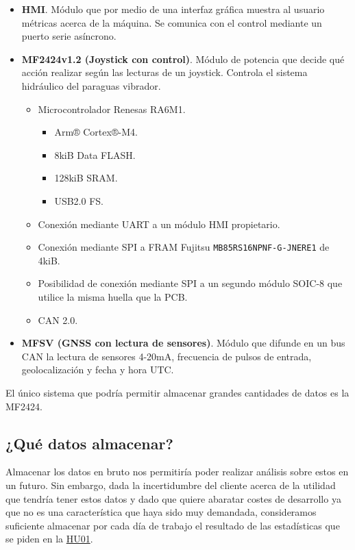 \begin{itemize}[noitemsep,nolistsep]
    \item \textbf{HMI}. Módulo que por medio de una interfaz gráfica muestra al usuario
          métricas acerca de la máquina. Se comunica con el control mediante un puerto
          serie asíncrono.
    \item \label{sec:joystick_con_control} \textbf{MF2424v1.2 (Joystick con control)}. Módulo de potencia que decide qué acción realizar
          según las lecturas de un joystick. Controla el sistema hidráulico del
          paraguas vibrador.
        \begin{itemize}[noitemsep,nolistsep]
            \item Microcontrolador Renesas RA6M1.
            \begin{itemize}[noitemsep,nolistsep]
                \item Arm® Cortex®-M4.
                \item 8kiB Data FLASH.
                \item 128kiB SRAM.
                \item USB2.0 FS.
            \end{itemize}
            \item Conexión mediante UART a un módulo HMI propietario.
            \item Conexión mediante SPI a FRAM Fujitsu \texttt{MB85RS16NPNF-G-JNERE1} de 4kiB.
            \item Posibilidad de conexión mediante SPI a un segundo módulo SOIC-8 que utilice la misma huella que la PCB.
            \item CAN 2.0.
        \end{itemize}
    \item \textbf{MFSV (GNSS con lectura de sensores)}. Módulo que difunde en un bus CAN la
          lectura de sensores 4-20mA, frecuencia de pulsos de entrada,
          geolocalización y fecha y hora UTC.
\end{itemize}

El único sistema que podría permitir almacenar grandes cantidades de datos es la MF2424.

\subsection{¿Qué datos almacenar?}

Almacenar los datos en bruto nos permitiría poder realizar análisis sobre estos en un futuro.
Sin embargo, dada la incertidumbre del cliente acerca de la utilidad que tendría tener estos
datos y dado que quiere abaratar costes de desarrollo ya que no es una característica
que haya sido muy demandada, consideramos suficiente almacenar por cada día de trabajo el
resultado de las estadísticas que se piden en la \hyperref[sec:HU01]{HU01}.

